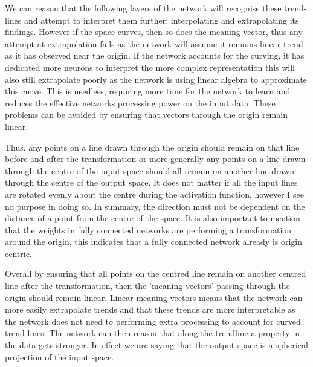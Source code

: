 \documentclass[onecolumn]{article}
\begin{document}
    We can reason that the following layers of the network will recognise these trend-lines and attempt to interpret them further: interpolating and extrapolating its findings. However if the space curves, then so does the meaning vector, thus any attempt at extrapolation fails as the network will assume it remains linear trend as it has observed near the origin. If the network accounts for the curving, it has dedicated more neurons to interpret the more complex representation this will also still extrapolate poorly as the network is using linear algebra to approximate this curve. This is needless, requiring more time for the network to learn and reduces the effective networks processing power on the input data. These problems can be avoided by ensuring that vectors through the origin remain linear. 
        
    Thus, any points on a line drawn through the origin should remain on that line before and after the transformation or more generally any points on a line drawn through the centre of the input space should all remain on another line drawn through the centre of the output space. It does not matter if all the input lines are rotated evenly about the centre during the activation function, however I see no purpose in doing so. In summary, the direction must not be dependent on the distance of a point from the centre of the space. It is also important to mention that the weights in fully connected networks are performing a transformation around the origin, this indicates that a fully connected network already is origin centric.

    Overall by ensuring that all points on the centred line remain on another centred line after the transformation, then the 'meaning-vectors' passing through the origin should remain linear. Linear meaning-vectors means that the network can more easily extrapolate trends and that these trends are more interpretable as the network does not need to performing extra processing to account for curved trend-lines. The network can then reason that along the trendline a property in the data gets stronger. In effect we are saying that the output space is a spherical projection of the input space.

        
\end{document}
